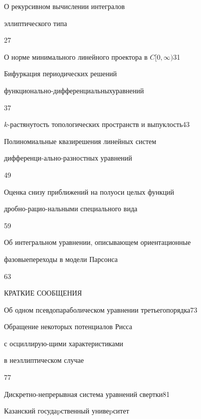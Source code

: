 

{О рекурсивном вычислении интегралов 


эллиптического типа}{27}




{О норме минимального линейного проектора в $C[0,\infty)$}{31}




{Бифуркация периодических решений 


функционально-дифференциальных\newline уравнений}{37}




{$k$-растянутость топологических пространств и выпуклость}{43}




{Полиномиальные квазирешения линейных систем


дифференци-\newline ально-разностных уравнений}{49}




{Оценка снизу приближений на полуоси целых функций 


дробно-рацио-\newline нальными специального вида}{59}




{Об интегральном уравнении, описывающем ориентационные 


фазовые\newline переходы в модели Парсонса}{63}





\bigskip


{\centerline {КРАТКИЕ СООБЩЕНИЯ}}


\bigskip







{Об одном псевдопараболическом уравнении третьего\newline порядка}{73}




{Обращение некоторых потенциалов Рисса 


с осциллирую-\newline щими характеристиками 


в неэллиптическом случае}{77}




{Дискретно-непрерывная система уравнений свертки}{81}








\vfill


\noindent\raisebox{2pt}{\copyright} Казанский госудаpственный унивеpситет





